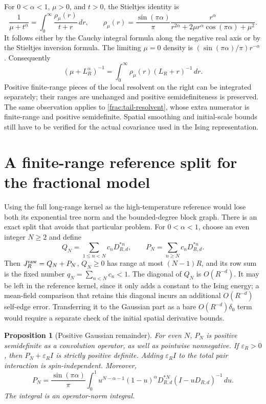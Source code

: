 \documentclass[11pt]{article}
\newtheorem{proposition}{Proposition}[section]
\begin{document}
For \(0<\alpha<1\), \(\mu>0\), and \(t>0\), the Stieltjes
identity is
\begin{equation}\label{frac:stieltjes}
 \frac1{\mu+t^\alpha}
 =\int_0^\infty\frac{\rho_\mu(r)}{t+r}\,dr,\qquad
 \rho_\mu(r)=\frac{\sin(\pi\alpha)}\pi
   \frac{r^\alpha}
   {r^{2\alpha}+2\mu r^\alpha\cos(\pi\alpha)+\mu^2}.
\end{equation}
It follows either by the Cauchy integral formula along the negative
real axis or by the Stieltjes inversion formula. The limiting
\(\mu=0\) density is \((\sin(\pi\alpha)/\pi)r^{-\alpha}\).
Consequently
\[
 (\mu+L_R^\alpha)^{-1}
       =\int_0^\infty\rho_\mu(r)(L_R+r)^{-1}\,dr.
\]
Positive finite-range pieces of the local resolvent on the right
can be integrated separately; their ranges are unchanged and
positive semidefiniteness is preserved. The same observation
applies to \eqref{frac:tail-resolvent}, whose extra numerator is
finite-range and positive semidefinite. Spatial smoothing and
initial-scale bounds still have to be verified for the actual
covariance used in the Ising representation.

\section{A finite-range reference split for the fractional model}
\label{frac:split}

Using the full long-range kernel as the high-temperature reference
would lose both its exponential tree norm and the bounded-degree
block graph. There is an exact split that avoids that particular
problem. For \(0<\alpha<1\), choose an even integer \(N\ge2\)
and define
\[
 Q_N=\sum_{1\le n<N}c_nD_{R,d}^{*n},\qquad
 P_N=\sum_{n\ge N}c_nD_{R,d}^{*n}.
\]
Then \(J_R^{\rm raw}=Q_N+P_N\), \(Q_N\ge0\) has range at most
\((N-1)R\), and its row sum is the fixed number
\(q_N=\sum_{n<N}c_n<1\). The diagonal of \(Q_N\) is
\(O(R^{-d})\). It may be left in the reference kernel, since it
only adds a constant to the Ising energy; a mean-field comparison
that retains this diagonal incurs an additional \(O(R^{-d})\)
self-edge error. Transferring it to the Gaussian part as a bare
\(O(R^{-d})\delta_0\) term would require a separate check of the
initial spatial derivative bounds.

\begin{proposition}[Positive Gaussian remainder]
\label{frac:positive-tail}
For even \(N\), \(P_N\) is positive semidefinite as a convolution
operator, as well as pointwise nonnegative. If
\(\varepsilon_R>0\), then \(P_N+\varepsilon_R I\) is strictly
positive definite. Adding \(\varepsilon_R I\) to the total pair
interaction is spin-independent. Moreover,
\begin{equation}\label{frac:tail-resolvent}
 P_N=\frac{\sin(\pi\alpha)}\pi
   \int_0^1 u^{N-\alpha-1}(1-u)^\alpha
              D_{R,d}^{*N}(I-uD_{R,d})^{-1}\,du.
\end{equation}
The integral is an operator-norm integral.
\end{proposition}
\end{document}
